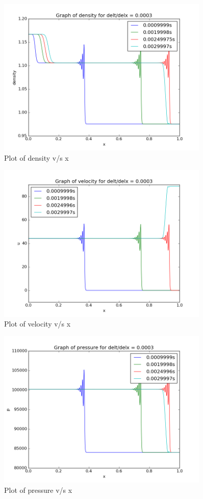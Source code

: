 \documentclass[11pt, a4paper]{article}
\begin{document}
\begin{figure}[H]
 \centering
 \includegraphics[width = 0.9\textwidth]{FTCS2_2_1.png}
 \caption{Plot of density v/s x}
\end{figure}
\begin{figure}[H]
 \centering
 \includegraphics[width = 0.9\textwidth]{FTCS2_2_4.png}
 \caption{Plot of velocity v/s x}
\end{figure}
\begin{figure}[H]
 \centering
 \includegraphics[width = 0.9\textwidth]{FTCS2_2_7.png}
 \caption{Plot of pressure v/s x}
\end{figure}
\end{document}
